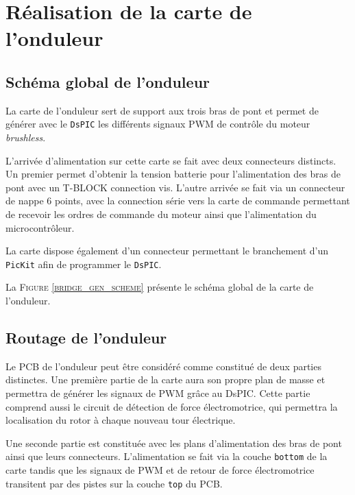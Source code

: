 		
	
	\newpage		
		
	\section{Réalisation de la carte de l'onduleur}
	
		\subsection{Schéma global de l'onduleur}
		
		La carte de l'onduleur sert de support aux trois bras de
		pont et permet de générer avec le \texttt{DsPIC} les différents
		signaux PWM de contrôle du moteur \textit{brushless}.
		
		L'arrivée d'alimentation sur cette carte se fait avec deux
		connecteurs distincts. Un premier permet d'obtenir la tension
		batterie pour l'alimentation des bras de pont avec un T-BLOCK
		connection vis. L'autre arrivée se fait via un connecteur de 
		nappe 6 points, avec la connection série vers la carte de
		commande permettant de recevoir les ordres de commande du
		moteur ainsi que l'alimentation du microcontrôleur.
		
		La carte dispose également d'un connecteur permettant le
		branchement d'un \texttt{PicKit} afin de programmer le \texttt{DsPIC}.
		
		La \textsc{Figure \ref{bridge_gen_scheme}} présente le schéma
		global de la carte de l'onduleur.
		
		\subsection{Routage de l'onduleur}
		
		Le PCB de l'onduleur peut être considéré comme constitué
		de deux parties distinctes. Une première partie de la carte
		aura son propre plan de masse et permettra de générer les
		signaux de PWM grâce au DsPIC. Cette partie comprend aussi
		le circuit de détection de force électromotrice, qui permettra
		la localisation du rotor à chaque nouveau tour électrique.
		
		Une seconde partie est constituée avec les plans d'alimentation
		des bras de pont ainsi que leurs connecteurs. L'alimentation
		se fait via la couche \texttt{bottom} de la carte tandis que les 
		signaux de PWM et de retour de force électromotrice transitent
		par des pistes sur la couche \texttt{top} du PCB. 
		
